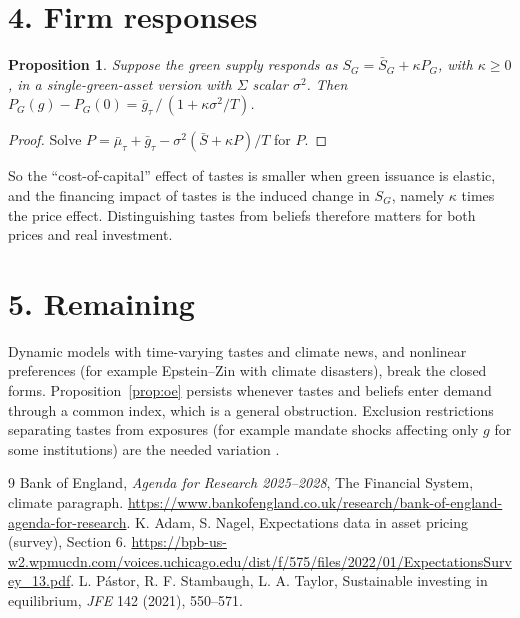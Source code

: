 \documentclass[11pt]{article}
\newtheorem{proposition}[theorem]{Proposition}
\theoremstyle{definition}
\begin{document}
\section*{4. Firm responses}
\begin{proposition}\label{prop:supply}
Suppose the green supply responds as $S_G=\bar S_G+\kappa P_G$, with $\kappa\ge0$, in a single-green-asset version with
$\Sigma$ scalar $\sigma^2$. Then $P_G(g)-P_G(0)=\bar g_\tau\,/\,(1+\kappa\sigma^2/T)$.
\end{proposition}
\begin{proof}
Solve $P=\bar\mu_\tau+\bar g_\tau-\sigma^2(\bar S+\kappa P)/T$ for $P$.
\end{proof}
So the ``cost-of-capital'' effect of tastes is smaller when green issuance is elastic, and the financing impact of tastes is
the induced change in $S_G$, namely $\kappa$ times the price effect. Distinguishing tastes from beliefs therefore matters
for both prices and real investment.

\section*{5. Remaining}
Dynamic models with time-varying tastes and climate news, and nonlinear preferences (for example Epstein--Zin with climate
disasters), break the closed forms. Proposition~\ref{prop:oe} persists whenever tastes and beliefs enter demand through a
common index, which is a general obstruction. Exclusion restrictions separating tastes from exposures (for example
mandate shocks affecting only $g$ for some institutions) are the needed variation \cite{boe,an}.

\begin{thebibliography}{9}
 Bank of England, \emph{Agenda for Research 2025--2028}, The Financial System, climate paragraph. \url{https://www.bankofengland.co.uk/research/bank-of-england-agenda-for-research}.
 K. Adam, S. Nagel, Expectations data in asset pricing (survey), Section 6.
\url{https://bpb-us-w2.wpmucdn.com/voices.uchicago.edu/dist/f/575/files/2022/01/ExpectationsSurvey_13.pdf}.
 L. P\'astor, R. F. Stambaugh, L. A. Taylor, Sustainable investing in equilibrium, \emph{JFE} 142 (2021), 550--571.
\end{thebibliography}
\end{document}
